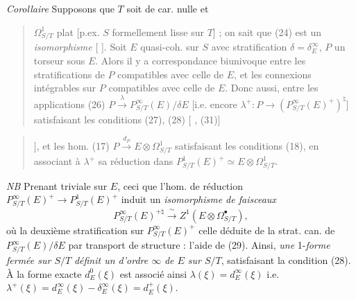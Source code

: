 \documentclass[11pt,a4paper]{article}
\begin{document}
\emph{Corollaire} Supposons que $T$ soit de car. nulle et
\begin{quote}
$\Omega^1_{S/T}$ plat [p.ex. $S$ formellement lisse sur $T$] ; on sait
que (24) est un \emph{isomorphisme} [ ]. \struck{\ill{}} Soit
$E$ quasi-coh. sur $S$ avec stratification $\delta = \delta^\infty_E$, $P$
un torseur sous $E$. Alors il y a correspondance
biunivoque entre les stratifications de $P$ compatibles
avec celle de $E$, et les connexions intégrables
sur $P$ compatibles avec celle de $E$. Donc
aussi, entre les applications (26) $P \xrightarrow{\lambda} P^\infty_{S/T}(E)/\delta E$ \struck{\ill{}}
[i.e. encore $\lambda^+ : P \to (P^\infty_{S/T}(E)^+)^{\natural}$] satisfaisant les
conditions (27), (28) [\struck{\ill{}} , (31)] \struck{\ill{}}  
\end{quote}

\begin{quote}
], et les hom. (17) $P \xrightarrow{d_P} E \otimes \Omega^1_{S/T}$
satisfaisant les conditions (18), en associant à $\lambda^+$
sa réduction dans $P^1_{S/T}(E)^+ \simeq E \otimes \Omega^1_{S/T}$.
\end{quote}

\emph{NB} Prenant  triviale sur $E$, ceci  que
l'hom.  de réduction $P^\infty_{S/T}(E)^+ \to P^1_{S/T}(E)^+$
induit un  \emph{isomorphisme de faisceaux}
\[
P^\infty_{S/T}(E)^{+\natural} \xrightarrow{\ \sim\ } Z^1(E \otimes \Omega^\bullet_{S/T}) ,
\]
où  \ill{} la deuxième   stratification
sur $P^\infty_{S/T}(E)^+$ celle déduite de la strat. can. de
$P^\infty_{S/T}(E)/\delta E$ par transport de structure : l'aide de
(29). Ainsi, \emph{une} 1-\emph{forme fermée sur $S/T$}
 \emph{définit un  d'ordre $\infty$} \add{$\lambda^+$} \emph{de $E$ sur $S/T$},
satisfaisant la condition (28). À la forme
exacte $d^0_E(\xi)$ est associé ainsi \struck{\ill{}}
\struck{\ill{}} $\lambda(\xi) = d^\infty_E(\xi)$ i.e. $\lambda^+(\xi) = d^\infty_E(\xi) - \delta^\infty_E(\xi) = d^+_E(\xi)$.
\end{document}
